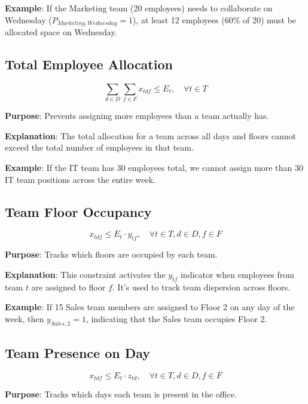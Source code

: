 \documentclass[12pt]{article}
\begin{document}
\textbf{Example}: If the Marketing team (20 employees) needs to collaborate on Wednesday ($P_{Marketing,Wednesday} = 1$), at least 12 employees (60\% of 20) must be allocated space on Wednesday.

\subsection{Total Employee Allocation}
\begin{equation}
\sum_{d \in D} \sum_{f \in F} x_{tdf} \leq E_t, \quad \forall t \in T
\end{equation}

\textbf{Purpose}: Prevents assigning more employees than a team actually has.

\textbf{Explanation}: The total allocation for a team across all days and floors cannot exceed the total number of employees in that team.

\textbf{Example}: If the IT team has 30 employees total, we cannot assign more than 30 IT team positions across the entire week.

\subsection{Team Floor Occupancy}
\begin{equation}
x_{tdf} \leq E_t \cdot y_{tf}, \quad \forall t \in T, d \in D, f \in F
\end{equation}

\textbf{Purpose}: Tracks which floors are occupied by each team.

\textbf{Explanation}: This constraint activates the $y_{tf}$ indicator when employees from team $t$ are assigned to floor $f$. It's used to track team dispersion across floors.

\textbf{Example}: If 15 Sales team members are assigned to Floor 2 on any day of the week, then $y_{Sales,2} = 1$, indicating that the Sales team occupies Floor 2.

\subsection{Team Presence on Day}
\begin{equation}
x_{tdf} \leq E_t \cdot z_{td}, \quad \forall t \in T, d \in D, f \in F
\end{equation}

\textbf{Purpose}: Tracks which days each team is present in the office.
\end{document}
